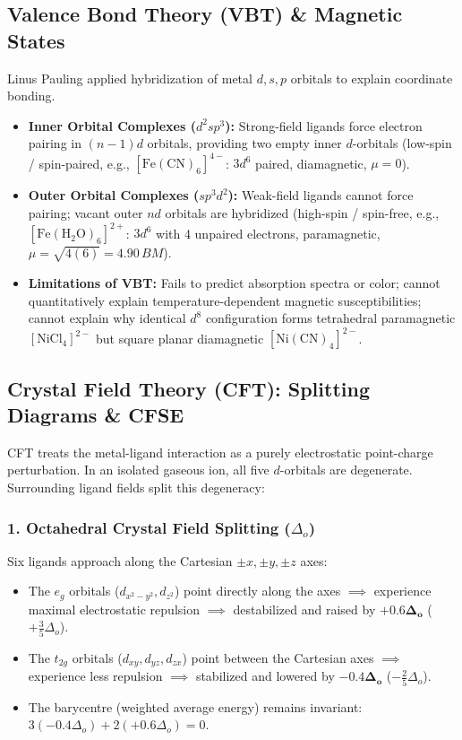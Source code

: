 \documentclass[10pt,a4paper]{article}
\begin{document}
\subsection{Valence Bond Theory (VBT) \& Magnetic States}
Linus Pauling applied hybridization of metal $d, s, p$ orbitals to explain coordinate bonding.
\begin{itemize}
  \item \textbf{Inner Orbital Complexes ($d^2sp^3$):} Strong-field ligands force electron pairing in $(n-1)d$ orbitals, providing two empty inner $d$-orbitals (low-spin / spin-paired, e.g., $[\mathrm{Fe(CN)_6}]^{4-}$: $3d^6$ paired, diamagnetic, $\mu = 0$).
  \item \textbf{Outer Orbital Complexes ($sp^3d^2$):} Weak-field ligands cannot force pairing; vacant outer $nd$ orbitals are hybridized (high-spin / spin-free, e.g., $[\mathrm{Fe(H_2O)_6}]^{2+}$: $3d^6$ with 4 unpaired electrons, paramagnetic, $\mu = \sqrt{4(6)} = 4.90\,\si{BM}$).
  \item \textbf{Limitations of VBT:} Fails to predict absorption spectra or color; cannot quantitatively explain temperature-dependent magnetic susceptibilities; cannot explain why identical $d^8$ configuration forms tetrahedral paramagnetic $[\mathrm{NiCl_4}]^{2-}$ but square planar diamagnetic $[\mathrm{Ni(CN)_4}]^{2-}$.
\end{itemize}

\subsection{Crystal Field Theory (CFT): Splitting Diagrams \& CFSE}
CFT treats the metal-ligand interaction as a purely electrostatic point-charge perturbation. In an isolated gaseous ion, all five $d$-orbitals are degenerate. Surrounding ligand fields split this degeneracy:

\subsubsection{1. Octahedral Crystal Field Splitting ($\Delta_o$)}
Six ligands approach along the Cartesian $\pm x, \pm y, \pm z$ axes:
\begin{itemize}
  \item The $e_g$ orbitals ($d_{x^2-y^2}, d_{z^2}$) point directly along the axes $\implies$ experience maximal electrostatic repulsion $\implies$ destabilized and raised by $\mathbf{+0.6\Delta_o}$ ($+\frac{3}{5}\Delta_o$).
  \item The $t_{2g}$ orbitals ($d_{xy}, d_{yz}, d_{zx}$) point between the Cartesian axes $\implies$ experience less repulsion $\implies$ stabilized and lowered by $\mathbf{-0.4\Delta_o}$ ($-\frac{2}{5}\Delta_o$).
  \item The barycentre (weighted average energy) remains invariant: $3(-0.4\Delta_o) + 2(+0.6\Delta_o) = 0$.
\end{itemize}
\end{document}
